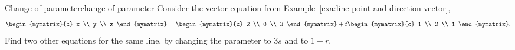 \begin{example}{Change of parameter}{change-of-parameter}
  Consider the vector equation from
  Example~\ref{exa:line-point-and-direction-vector},
  \begin{equation*}
    \begin{mymatrix}{c} x \\ y \\ z \end{mymatrix}
    = \begin{mymatrix}{c} 2 \\ 0 \\ 3 \end{mymatrix}
    + t \begin{mymatrix}{c} 1 \\ 2 \\ 1 \end{mymatrix}.
  \end{equation*}
  Find two other equations for the same line, by changing the
  parameter to $3s$ and to $1-r$.
\end{example}

